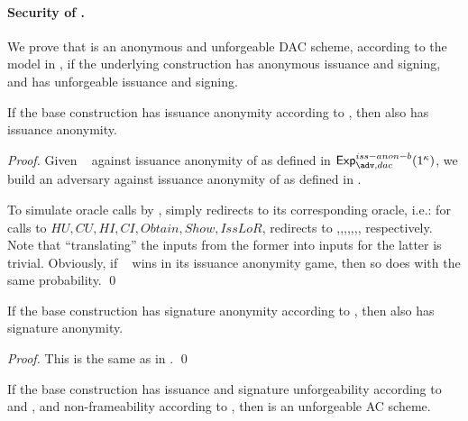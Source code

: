 \paragraph{Security of \CUASDAC.} %
We prove that \CUASDAC is an anonymous and unforgeable DAC scheme, according to
the model in , if the underlying \CUASGen construction has
anonymous issuance and signing, and has unforgeable issuance and signing. 

\begin{theorem}
  If the base \CUASGen construction has issuance anonymity according to
  , then \CUASDAC also has issuance anonymity.
\end{theorem}

\begin{proof}
  Given \adv~ against issuance anonymity of \CUASDAC as defined in
  $\Exp^{iss-anon-b}_{\adv,dac}(1^\secpar)$, we build an adversary \advB against
  issuance anonymity of \CUASGen as defined in .

  To simulate oracle calls by \adv, \advB simply redirects to its corresponding
  oracle, i.e.: for calls to $HU,CU,HI,CI,Obtain,Show,IssLoR$, \advB redirects
  to \HUGEN,\CUGEN,\IGEN,\ICORR,\OBTAIN,\SIGN,\OBTCHALb, respectively. Note that
  ``translating'' the inputs from the former into inputs for the latter is
  trivial. Obviously, if \adv~ wins in its issuance anonymity game, then so does
  \advB with the  same probability.
  \qed
\end{proof}

\begin{theorem}
  If the base \CUASGen construction has signature anonymity according to
  , then \CUASDAC also has signature anonymity.
\end{theorem}

\begin{proof}
  This is the same as in .
  \qed
\end{proof}

\begin{theorem}
  If the base \CUASGen construction has issuance and signature unforgeability
  according to  and , and
  non-frameability according to , then \CUASAC is an
  unforgeable AC scheme.
\end{theorem}

